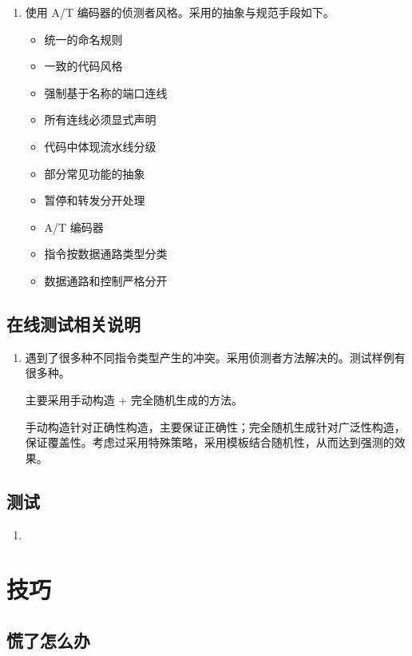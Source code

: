 \documentclass[12pt,AutoFakeBold,AutoFakeSlant]{article}
\begin{document}
\begin{enumerate}
\item 使用 A/T 编码器的侦测者风格。采用的抽象与规范手段如下。
\begin{itemize}
 \item 统一的命名规则
 \item 一致的代码风格
 \item 强制基于名称的端口连线
 \item 所有连线必须显式声明
 \item 代码中体现流水线分级
 \item 部分常见功能的抽象
 \item 暂停和转发分开处理
 \item A/T 编码器
 \item 指令按数据通路类型分类
 \item 数据通路和控制严格分开
\end{itemize}
\end{enumerate}

\subsection{在线测试相关说明}

\begin{enumerate}
\item 遇到了很多种不同指令类型产生的冲突。采用侦测者方法解决的。测试样例有很多种。

主要采用手动构造 + 完全随机生成的方法。

手动构造针对正确性构造，主要保证正确性；完全随机生成针对广泛性构造，保证覆盖性。考虑过采用特殊策略，采用模板结合随机性，从而达到强测的效果。
\end{enumerate}

\subsection{测试}

\begin{enumerate}
\item 
\end{enumerate}


\hypertarget{ux6280ux5de7}{%
\section{技巧}\label{ux6280ux5de7}}

\hypertarget{ux614cux4e86ux600eux4e48ux529e}{%
\subsection{慌了怎么办}\label{ux614cux4e86ux600eux4e48ux529e}}
\end{document}
